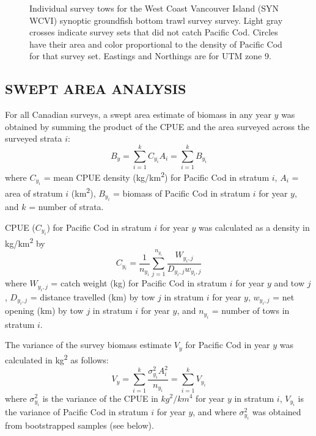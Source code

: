 \documentclass[11pt]{book}
\begin{document}
\begin{figure}[htb]

{\centering {} 

}

\caption{Individual survey tows for the West Coast Vancouver Island (SYN WCVI) synoptic groundfish bottom trawl survey survey. Light gray crosses indicate survey sets that did not catch Pacific Cod. Circles have their area and color proportional to the density of Pacific Cod for that survey set. Eastings and Northings are for UTM zone 9.}\label{fig:survey-maps-syn-wcvi}
\end{figure}
\clearpage

\hypertarget{swept-area-analysis}{%
\subsection{SWEPT AREA ANALYSIS}\label{swept-area-analysis}}

For all Canadian surveys, a swept area estimate of biomass in any year \(y\) was obtained by summing the product of the CPUE and the area surveyed across the surveyed strata \(i\):
\begin{equation}
  B_y = \sum_{i=1}^kC_{y_i}A_i=\sum_{i=1}^kB_{y_i}
  \label{eq:sweptareabiomass}
\end{equation}
where \(C_{y_i}\) = mean CPUE density (kg/km\textsuperscript{2}) for Pacific Cod in stratum \(i\), \(A_i\) = area of stratum \(i\) (km\textsuperscript{2}), \(B_{y_i}\) = biomass of Pacific Cod in stratum \(i\) for year \(y\), and \(k\) = number of strata.

CPUE (\(C_{y_i}\)) for Pacific Cod in stratum \(i\) for year \(y\) was calculated as a density in kg/km\textsuperscript{2} by
\begin{equation}
  C_{y_i}=\frac{1}{n_{y_i}} \sum\limits_{j=1}^{n_{y_i}} \frac{W_{y_i,j}}{D_{y_i,j}w_{y_i,j}}
  \label{eq:sweptareacpue}
\end{equation}
where \(W_{y_i,j}\) = catch weight (kg) for Pacific Cod in stratum \(i\) for year \(y\) and tow \(j\), \(D_{y_i,j}\) = distance travelled (km) by tow \(j\) in stratum \(i\) for year \(y\), \(w_{y_i,j}\) = net opening (km) by tow \(j\) in stratum \(i\) for year \(y\), and \(n_{y_i}\) = number of tows in stratum \(i\).

The variance of the survey biomass estimate \(V_y\) for Pacific Cod in year \(y\) was calculated in kg\textsuperscript{2} as follows:
\begin{equation}
  V_y=\sum_{i=1}^k\frac{\sigma_{y_i}^2A_i^2}{n_{y_i}}=\sum_{i=1}^kV_{y_i}
  \label{eq:sweptareavariance}
\end{equation}
where \(\sigma_{y_i}^2\) is the variance of the CPUE in \(kg^2/km^4\) for year \(y\) in stratum \(i\), \(V_{y_i}\) is the variance of Pacific Cod in stratum \(i\) for year \(y\), and where \(\sigma_{y_i}^2\) was obtained from bootstrapped samples (see below).
\end{document}

